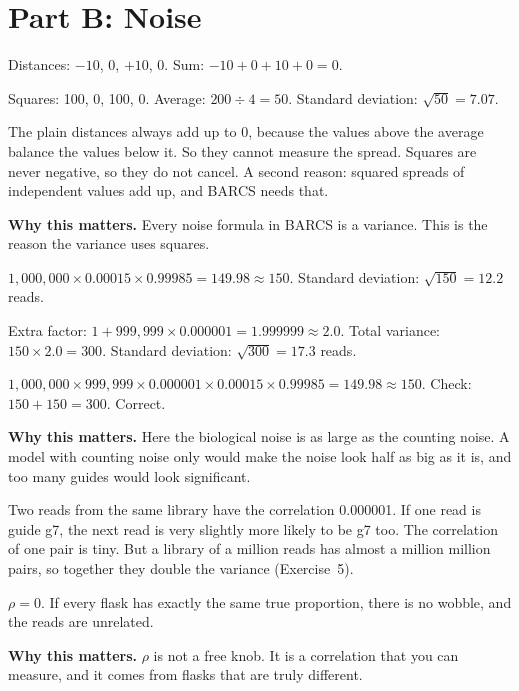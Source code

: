 \documentclass[12pt]{article}
\newcommand{\why}[1]{\par\smallskip\noindent\textcolor{barcsgreen!70!black}{\textbf{Why this matters.}} #1}
\begin{document}
\section*{Part B: Noise}
\begin{exlist}[resume]
\item
\begin{parts}
\item Distances: $-10$, $0$, $+10$, $0$. Sum: $-10 + 0 + 10 + 0 = 0$.
\item Squares: 100, 0, 100, 0. Average: $200 \div 4 = 50$. Standard
  deviation: $\sqrt{50} = 7.07$.
\item The plain distances always add up to 0, because the values above the
  average balance the values below it. So they cannot measure the spread.
  Squares are never negative, so they do not cancel. A second reason:
  squared spreads of independent values add up, and BARCS needs that.
\end{parts}
\why{Every noise formula in BARCS is a variance. This is the reason the
variance uses squares.}

\item
\begin{parts}
\item $1{,}000{,}000 \times 0.00015 \times 0.99985 = 149.98 \approx 150$.
  Standard deviation: $\sqrt{150} = 12.2$ reads.
\item Extra factor: $1 + 999{,}999 \times 0.000001 = 1.999999 \approx 2.0$.
  Total variance: $150 \times 2.0 = 300$. Standard deviation:
  $\sqrt{300} = 17.3$ reads.
\item $1{,}000{,}000 \times 999{,}999 \times 0.000001 \times 0.00015 \times
  0.99985 = 149.98 \approx 150$. Check: $150 + 150 = 300$. Correct.
\end{parts}
\why{Here the biological noise is as large as the counting noise. A model
with counting noise only would make the noise look half as big as it is,
and too many guides would look significant.}

\item
\begin{parts}
\item Two reads from the same library have the correlation 0.000001. If one
  read is guide g7, the next read is very slightly more likely to be g7 too.
  The correlation of one pair is tiny. But a library of a million reads has
  almost a million million pairs, so together they double the variance
  (Exercise~5).
\item $\rho = 0$. If every flask has exactly the same true proportion, there
  is no wobble, and the reads are unrelated.
\end{parts}
\why{$\rho$ is not a free knob. It is a correlation that you can measure,
and it comes from flasks that are truly different.}


\end{exlist}
\end{document}

